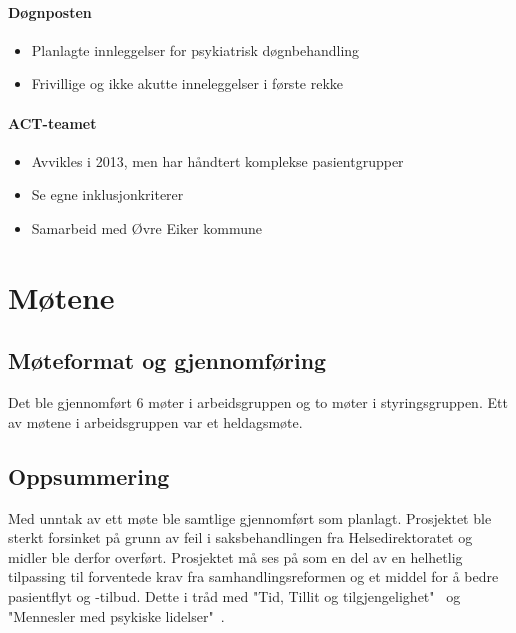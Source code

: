 \documentclass[11pt]{report} %
\begin{document}
                        \subsubsection{Døgnposten}\label{sec:org_kdps_dogn}
                          \begin{itemize}
                            \item Planlagte innleggelser for psykiatrisk døgnbehandling\\
                            \item Frivillige og ikke akutte inneleggelser i første rekke\\
                          \end{itemize}  
                        \subsubsection{ACT-teamet}\label{sec:org_kdps_act}
                          \begin{itemize}
                            \item Avvikles i 2013, men har håndtert komplekse pasientgrupper\\
                            \item Se egne inklusjonkriterer\\
                            \item Samarbeid med Øvre Eiker kommune\\
                          \end{itemize}  
                        




              \chapter{Møtene}\label{chap:m_main}
                \section{Møteformat og gjennomføring}\label{sec:m_form}
                  Det ble gjennomført 6 møter i arbeidsgruppen og to møter i styringsgruppen. Ett av møtene i arbeidsgruppen var et heldagsmøte.
                \section{Oppsummering}\label{sec:m_sum}  
                  Med unntak av ett møte ble samtlige gjennomført som planlagt. Prosjektet ble sterkt forsinket på grunn av feil i saksbehandlingen fra Helsedirektoratet og midler ble derfor overført. Prosjektet må ses på som en del av en helhetlig tilpassing til forventede krav fra samhandlingsreformen og et middel for å bedre pasientflyt og -tilbud. Dette i tråd med "Tid, Tillit og tilgjengelighet"~\cite{tid_til_tilgj} og "Mennesler med psykiske lidelser"~\cite{m_psyk_lid}.
\end{document}
